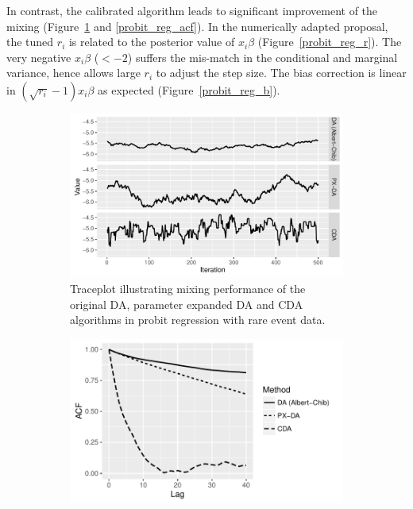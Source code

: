 \documentclass[10pt]{article}
\newcommand{\xbeta}{ x_i \beta}
\begin{document}
In contrast, the calibrated algorithm leads to significant improvement of the mixing (Figure~\ref{probit_reg_trace} and \ref{probit_reg_acf}). In the numerically adapted proposal, the tuned $r_i$ is related to the posterior value of $\xbeta$ (Figure~\ref{probit_reg_r}). The very negative $\xbeta$ ($< -2$) suffers the mis-match in the conditional and marginal variance, hence allows large $r_i$ to adjust the step size. The bias correction is linear in $(\sqrt{r_i}-1 ) \xbeta$ as expected (Figure~\ref{probit_reg_b}).
 
 
\begin{figure}[H]
  \begin{subfigure}[b]{0.49\textwidth}
 \includegraphics[width=1\textwidth]{probit15_trace_plot.pdf}
  \caption{Traceplot illustrating mixing performance of the original DA, parameter expanded DA and CDA algorithms in probit regression with rare event data.}
  \label{probit_reg_trace}
\end{subfigure}
  \hfill
   \begin{subfigure}[b]{0.49\textwidth}
 \includegraphics[width=1\textwidth]{probit15_acf.pdf}

\end{subfigure}
\end{figure}
\end{document}
